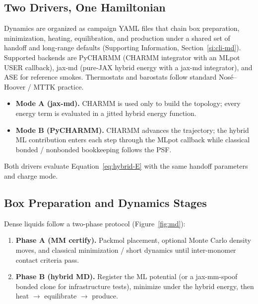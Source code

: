 \documentclass[journal=jctc,manuscript=article]{achemso}
\begin{document}
\subsection{Two Drivers, One Hamiltonian}

Dynamics are organized as campaign YAML files that chain box preparation,
minimization, heating, equilibration, and production under a shared set of
handoff and long-range defaults (Supporting Information,
Section~\ref{si:cli-md}).\cite{FrenkelSmit2002,AllenTildesley2017}
Supported backends are PyCHARMM (CHARMM integrator with an MLpot USER
callback),\cite{Brooks2009CHARMM} jax-md (pure-JAX hybrid energy with a jax-md
integrator),\cite{Schoenholz2019JaxMD} and ASE for reference smokes. Thermostats
and barostats follow standard Nos\'{e}--Hoover / MTTK
practice.\cite{Martyna1992,Martyna1994}

\begin{itemize}
\item \textbf{Mode A (jax-md).} CHARMM is used only to build the topology;
  every energy term is evaluated in a jitted hybrid energy function.
\item \textbf{Mode B (PyCHARMM).} CHARMM advances the trajectory; the hybrid ML
  contribution enters each step through the MLpot callback while classical
  bonded / nonbonded bookkeeping follows the PSF.
\end{itemize}
Both drivers evaluate Equation~\ref{eq:hybrid-E} with the same handoff
parameters and charge mode.

\subsection{Box Preparation and Dynamics Stages}

Dense liquids follow a two-phase protocol (Figure~\ref{fig:md}):
\begin{enumerate}
\item \textbf{Phase A (MM certify).} Packmol placement,\cite{Martinez2009}
  optional Monte Carlo density moves, and classical minimization / short
  dynamics until inter-monomer contact criteria pass.
\item \textbf{Phase B (hybrid MD).} Register the ML potential (or a jax-mm-spoof
  bonded clone for infrastructure tests), minimize under the hybrid energy,
  then heat \(\to\) equilibrate \(\to\) produce.
\end{enumerate}
\end{document}
